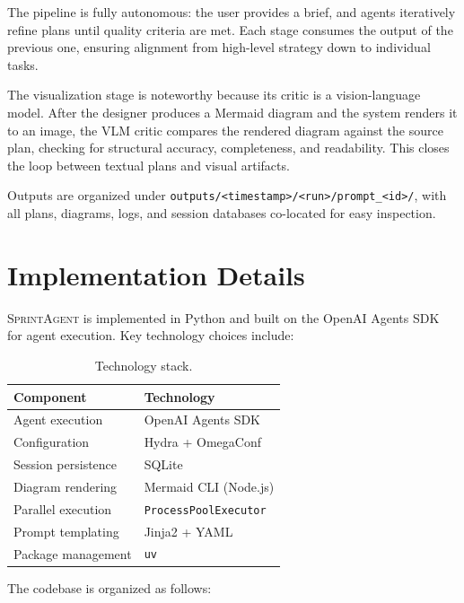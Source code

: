 \documentclass[11pt, a4paper]{article}
\newcommand{\sprintagent}{\textsc{SprintAgent}}
\begin{document}
The pipeline is fully autonomous: the user provides a brief, and agents
iteratively refine plans until quality criteria are met.  Each stage
consumes the output of the previous one, ensuring alignment from
high-level strategy down to individual tasks.

The visualization stage is noteworthy because its critic is a
vision-language model.  After the designer produces a Mermaid diagram
and the system renders it to an image, the VLM critic compares the
rendered diagram against the source plan, checking for structural
accuracy, completeness, and readability.  This closes the loop between
textual plans and visual artifacts.

Outputs are organized under
\texttt{outputs/<timestamp>/<run>/prompt\_<id>/}, with all plans,
diagrams, logs, and session databases co-located for easy inspection.

\section{Implementation Details}
\label{sec:implementation}

\sprintagent{} is implemented in Python and built on the OpenAI Agents
SDK~\cite{openaiagentssdk2025} for agent execution.  Key technology
choices include:

\begin{table}[H]
  \centering
  \caption{Technology stack.}
  \label{tab:stack}
  \begin{tabular}{@{}ll@{}}
    \toprule
    \textbf{Component}          & \textbf{Technology} \\
    \midrule
    Agent execution             & OpenAI Agents SDK \\
    Configuration               & Hydra + OmegaConf \\
    Session persistence         & SQLite \\
    Diagram rendering           & Mermaid CLI (Node.js) \\
    Parallel execution          & \texttt{ProcessPoolExecutor} \\
    Prompt templating           & Jinja2 + YAML \\
    Package management          & \texttt{uv} \\
    \bottomrule
  \end{tabular}
\end{table}

The codebase is organized as follows:
\end{document}
